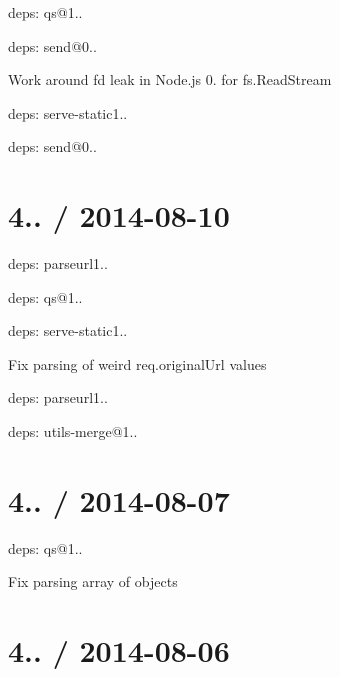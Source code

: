 \begin{DoxyItemize}
\item deps\+: qs@1..
\item deps\+: send@0..
\begin{DoxyItemize}
\item Work around {\ttfamily fd} leak in Node.\+js 0. for {\ttfamily fs.\+Read\+Stream}
\end{DoxyItemize}
\item deps\+: serve-\/static1..
\begin{DoxyItemize}
\item deps\+: send@0..
\end{DoxyItemize}
\end{DoxyItemize}

\section*{4.. / 2014-\/08-\/10 }


\begin{DoxyItemize}
\item deps\+: parseurl1..
\item deps\+: qs@1..
\item deps\+: serve-\/static1..
\begin{DoxyItemize}
\item Fix parsing of weird {\ttfamily req.\+original\+Url} values
\item deps\+: parseurl1..
\item deps\+: utils-\/merge@1..
\end{DoxyItemize}
\end{DoxyItemize}

\section*{4.. / 2014-\/08-\/07 }


\begin{DoxyItemize}
\item deps\+: qs@1..
\begin{DoxyItemize}
\item Fix parsing array of objects
\end{DoxyItemize}
\end{DoxyItemize}

\section*{4.. / 2014-\/08-\/06 }


